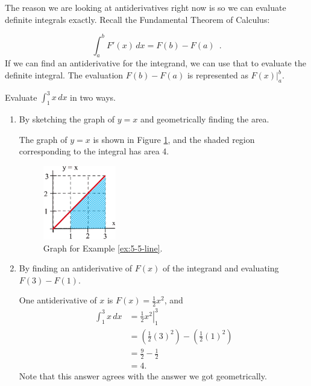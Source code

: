The reason we are looking at antiderivatives right now is so we can evaluate definite integrals exactly. Recall the Fundamental Theorem of Calculus:

$$\int_a^b F'(x)\, dx =F(b)-F(a) \enspace .$$
If we can find an antiderivative for the integrand, we can use that to evaluate the definite integral. The evaluation $F(b)-F(a)$ is represented as $\left. F(x)\right|_a^b$.

\begin{example}
  \label{ex:5-5-line}
Evaluate $\displaystyle\int_1^3 x\, dx$  in two ways.
  \begin{enumerate}[label=(\alph*)]
    \item By sketching the graph of $y=x$ and geometrically finding the area.

    \begin{solution}
      The graph of $y=x$ is shown in Figure \ref{fig:5-5-line}, and the shaded region corresponding to the integral has area 4.

      \begin{figure}[!ht]
        \centering
          \includegraphics[width=0.3\textwidth]{img/chap5/image043.png}
          \caption{Graph for Example \ref{ex:5-5-line}.}
          \label{fig:5-5-line}
      \end{figure}
    \end{solution}
    \item By finding an antiderivative of $F(x)$ of the integrand and evaluating $F(3)-F(1)$.

      \begin{solution}
        One antiderivative of $x$ is $F(x)=\frac{1}{2}x^2$, and
         \begin{align*}
         \int_1^3 x\, dx &= \left.\frac{1}{2}x^2\right|_1^3 \\
         &= \left(\frac{1}{2}(3)^2\right) - \left(\frac{1}{2}(1)^2\right)\\
         &= \frac{9}{2} - \frac{1}{2} \\
         &= 4.
       \end{align*}
     Note that this answer agrees with the answer we got geometrically.


\end{solution}
\end{enumerate}
\end{example}
